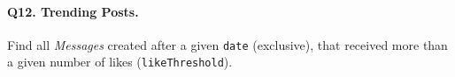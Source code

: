 \paragraph{\textbf{Q12}. Trending Posts.}
Find all \emph{Messages} created after a given \texttt{date}
(exclusive), that received more than a given number of likes
(\texttt{likeThreshold}).
